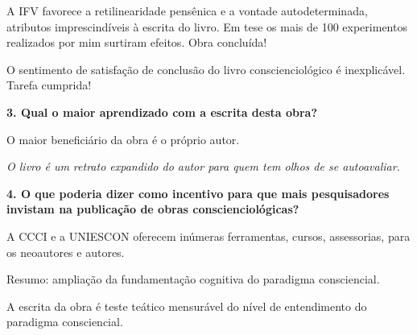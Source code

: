 \documentclass{gescons}
\begin{document}
\begin{multicols}{2}
A IFV favorece a retilinearidade pensênica e a vontade autodeterminada, atributos imprescindíveis à escrita do livro. Em tese os mais de 100 experimentos realizados por mim surtiram efeitos. Obra concluída!

O sentimento de satisfação de conclusão do livro conscienciológico é inexplicável. Tarefa cumprida!



\textbf{3. Qual o maior aprendizado com a escrita desta obra?}


O maior beneficiário da obra é o próprio autor.

\emph{O livro é um retrato expandido do autor para quem tem olhos de se autoavaliar.}


\textbf{4. O que poderia dizer como incentivo para que mais pesquisadores invistam na publicação de obras conscienciológicas?}

A CCCI e a UNIESCON oferecem inúmeras ferramentas, cursos, assessorias, para os neoautores e autores.

Resumo: ampliação da fundamentação cognitiva do paradigma consciencial.

A escrita da obra é teste teático mensurável do nível de entendimento do paradigma consciencial.


    
    \end{multicols}
\end{document}
